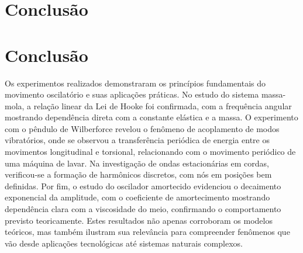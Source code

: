 \section{Conclusão}
\section{Conclusão} 

Os experimentos realizados demonstraram os princípios fundamentais do movimento oscilatório e suas aplicações práticas. No estudo do sistema massa-mola, a relação linear da Lei de Hooke foi confirmada, com a frequência angular mostrando dependência direta com a constante elástica e a massa. O experimento com o pêndulo de Wilberforce revelou o fenômeno de acoplamento de modos vibratórios, onde se observou a transferência periódica de energia entre os movimentos longitudinal e torsional, relacionando com o movimento periódico de uma máquina de lavar. Na investigação de ondas estacionárias em cordas, verificou-se a formação de harmônicos discretos, com nós em posições bem definidas. Por fim, o estudo do oscilador amortecido evidenciou o decaimento exponencial da amplitude, com o coeficiente de amortecimento mostrando dependência clara com a viscosidade do meio, confirmando o comportamento previsto teoricamente. Estes resultados não apenas corroboram os modelos teóricos, mas também ilustram sua relevância para compreender fenômenos que vão desde aplicações tecnológicas até sistemas naturais complexos.